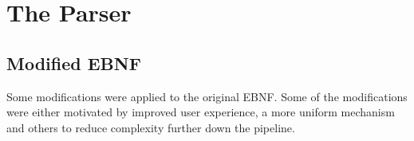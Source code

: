\section{The Parser}

\subsection{Modified EBNF}

\setlength{\grammarparsep}{8pt plus 1pt minus 1pt} %
\setlength{\grammarindent}{10em} %

Some modifications were applied to the original EBNF. Some of
the modifications were either motivated by improved user
experience, a more uniform mechanism and others to reduce
complexity further down the pipeline.

